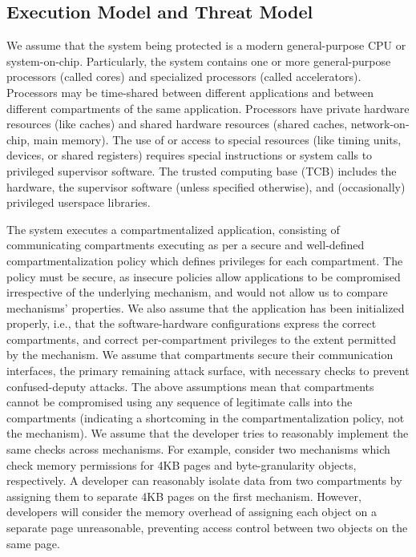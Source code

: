 \subsection{Execution Model and Threat Model}
\label{sec:compsok:threatmodel}
We assume that the system being protected is a modern general-purpose CPU
or system-on-chip.
Particularly, the system contains one or more general-purpose 
processors (called cores) and specialized processors (called accelerators).
Processors may be time-shared between different applications and
between different compartments of the same application.
Processors have private hardware resources (like caches) and
shared hardware resources (shared caches, network-on-chip, main memory).
The use of or access to special 
resources (like timing units, devices, or shared registers) requires
special instructions or system calls to privileged supervisor software.
The trusted computing base (TCB) includes the hardware, the 
supervisor software (unless specified otherwise),
and (occasionally) privileged userspace libraries.

The system executes a compartmentalized application, consisting of
communicating compartments executing as per a secure and well-defined 
compartmentalization policy which defines privileges for each compartment.
The policy must be secure, as insecure policies allow applications to be
compromised irrespective of the underlying mechanism, and would not allow
us to compare mechanisms' properties.
We also assume that the application has been initialized properly, i.e.,
that the software-hardware configurations express the correct
compartments, and correct per-compartment privileges to the extent permitted
by the mechanism. 
We assume that compartments secure their communication interfaces, the 
primary remaining attack surface, with necessary checks to prevent 
confused-deputy attacks.
The above assumptions mean that compartments cannot be compromised using 
any sequence of legitimate calls into the compartments
(indicating a shortcoming in the compartmentalization policy, not the
mechanism).
We assume that the developer tries to reasonably implement the same
checks across mechanisms.
For example, consider two mechanisms which check memory permissions for 
4KB pages and byte-granularity objects, respectively.
A developer can reasonably isolate data from two compartments by assigning them
to separate 4KB pages on the first mechanism.
However, developers will consider the memory overhead of assigning each
object on a separate page unreasonable, preventing access control between
two objects on the same page.

